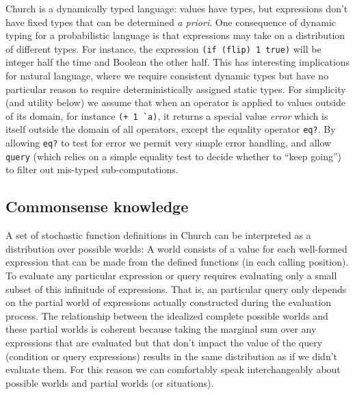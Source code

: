 \documentclass[pdfextras]{handbook}
\begin{document}

\label{bottom-val}
Church is a dynamically typed language: values have types, but expressions don't have fixed types that can be determined \emph{a priori}. 
One consequence of dynamic typing for a probabilistic language is that expressions may take on a distribution of different types. For instance, the expression \lstinline{(if (flip) 1 true)} will be integer half the time and Boolean the other half. This has interesting implications for natural language, where we require consistent dynamic types but have no particular reason to require deterministically assigned static types.
For simplicity (and utility below) we assume that when an operator is applied to values outside of its domain, for instance \lstinline{(+ 1 `a)}, it returns a special value \emph{error} which is itself outside the domain of all operators, except the equality operator \lstinline{eq?}. By allowing \lstinline{eq?} to test for error we permit very simple error handling, and allow \lstinline{query} (which relies on a simple equality test to decide whether to ``keep going'') to filter out mis-typed sub-computations.




\subsection{Commonsense knowledge}

A set of stochastic function definitions in Church can be interpreted as a distribution over possible worlds: A world consists of a value for each well-formed expression that can be made from the defined functions (in each calling position). 
To evaluate any particular expression or query requires evaluating only a small subset of this infinitude of expressions. 
That is, an particular query only depends on the partial world of expressions actually constructed during the evaluation process. 
The relationship between the idealized complete possible worlds and these partial worlds is coherent because taking the marginal sum over any expressions that are evaluated but that don't impact the value of the query (condition or query expressions) results in the same distribution as if we didn't evaluate them. 
For this reason we can comfortably speak interchangeably about possible worlds and partial worlds (or situations).
\end{document}
